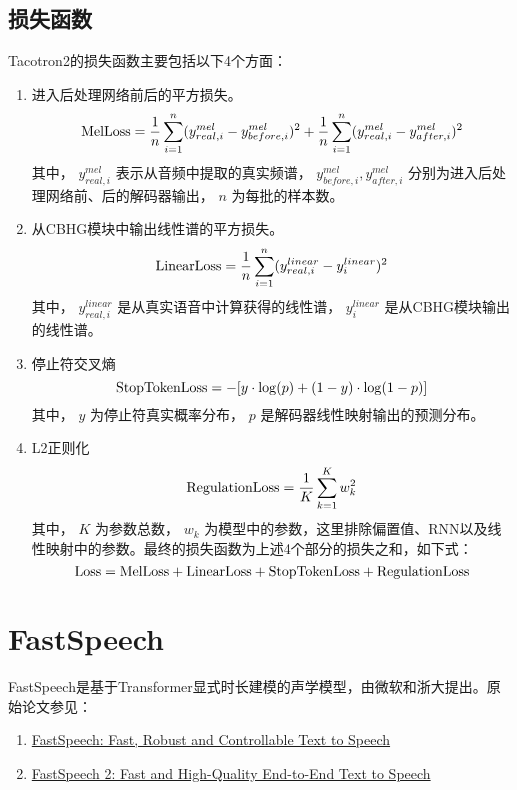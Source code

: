 \documentclass[cn,10pt,math=newtx,citestyle=gb7714-2015,bibstyle=gb7714-2015]{elegantbook}
\begin{document}
\subsection{损失函数}

Tacotron2的损失函数主要包括以下4个方面：

\begin{enumerate}
  \item 进入后处理网络前后的平方损失。
  \begin{equation}
    {\rm MelLoss}=\frac{1}{n}\sum_{i=1}^n(y_{real,i}^{mel}-y_{before,i}^{mel})^2+\frac{1}{n}\sum_{i=1}^n(y_{real,i}^{mel}-y_{after,i}^{mel})^2
  \end{equation}
  其中， $y_{real,i}^{mel}$ 表示从音频中提取的真实频谱， $y_{before,i}^{mel},y_{after,i}^{mel}$ 分别为进入后处理网络前、后的解码器输出， $n$ 为每批的样本数。
  \item 从CBHG模块中输出线性谱的平方损失。
  \begin{equation}
    {\rm LinearLoss}=\frac{1}{n}\sum_{i=1}^{n}(y_{real,i}^{linear}-y_{i}^{linear})^2
  \end{equation}
  其中， $y_{real,i}^{linear}$ 是从真实语音中计算获得的线性谱， $y_{i}^{linear}$ 是从CBHG模块输出的线性谱。
  \item 停止符交叉熵
  \begin{equation}
    {\rm StopTokenLoss}=-[y\cdot {\rm log}(p)+(1-y)\cdot {\rm log}(1-p)]
  \end{equation}
  其中， $y$ 为停止符真实概率分布， $p$ 是解码器线性映射输出的预测分布。
  \item L2正则化
  \begin{equation}
    {\rm RegulationLoss}=\frac{1}{K}\sum_{k=1}^K w_k^2
  \end{equation}
  其中， $K$ 为参数总数， $w_k$ 为模型中的参数，这里排除偏置值、RNN以及线性映射中的参数。最终的损失函数为上述4个部分的损失之和，如下式：
  \begin{equation}
    {\rm Loss}={\rm MelLoss}+{\rm LinearLoss}+{\rm StopTokenLoss}+{\rm RegulationLoss}
  \end{equation}
\end{enumerate}

\section{FastSpeech}

FastSpeech是基于Transformer显式时长建模的声学模型，由微软和浙大提出。原始论文参见：

\begin{enumerate}
  \item \href{https://arxiv.org/abs/1905.09263}{FastSpeech: Fast, Robust and Controllable Text to Speech}
  \item \href{https://arxiv.org/abs/2006.04558}{FastSpeech 2: Fast and High-Quality End-to-End Text to Speech}
\end{enumerate}
\end{document}
